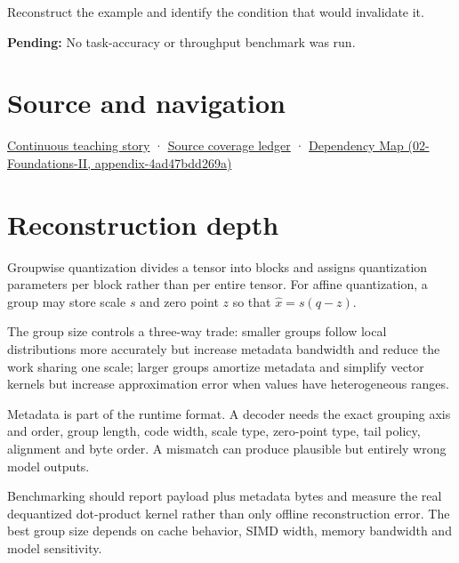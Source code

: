 Reconstruct the example and identify the condition that would invalidate it.

\textbf{Pending:} No task-accuracy or throughput benchmark was run.

\section{Source and navigation}\label{appendix-638204c40e8b-source-and-navigation}

\href{Continuous\%20Notes/Computing\%20Foundations\%20-\%20From\%20Bits\%20to\%20C++\%20and\%20Systems\%20APIs\#Choosing\%20what\%20information\%20to\%20keep}{Continuous teaching story} · \hyperref[appendix-fd090d982a15]{Source coverage ledger} · \href{../02-Foundations-II/main.pdf\#nameddest=appendix-4ad47bdd269a}{Dependency Map (02-Foundations-II, appendix-4ad47bdd269a)}

\section{Reconstruction depth}\label{appendix-638204c40e8b-reconstruction-depth}

Groupwise quantization divides a tensor into blocks and assigns quantization parameters per block rather than per entire tensor. For affine quantization, a group may store scale \(s\) and zero point \(z\) so that \(\hat x=s(q-z)\).

The group size controls a three-way trade: smaller groups follow local distributions more accurately but increase metadata bandwidth and reduce the work sharing one scale; larger groups amortize metadata and simplify vector kernels but increase approximation error when values have heterogeneous ranges.

Metadata is part of the runtime format. A decoder needs the exact grouping axis and order, group length, code width, scale type, zero-point type, tail policy, alignment and byte order. A mismatch can produce plausible but entirely wrong model outputs.

Benchmarking should report payload plus metadata bytes and measure the real dequantized dot-product kernel rather than only offline reconstruction error. The best group size depends on cache behavior, SIMD width, memory bandwidth and model sensitivity.
